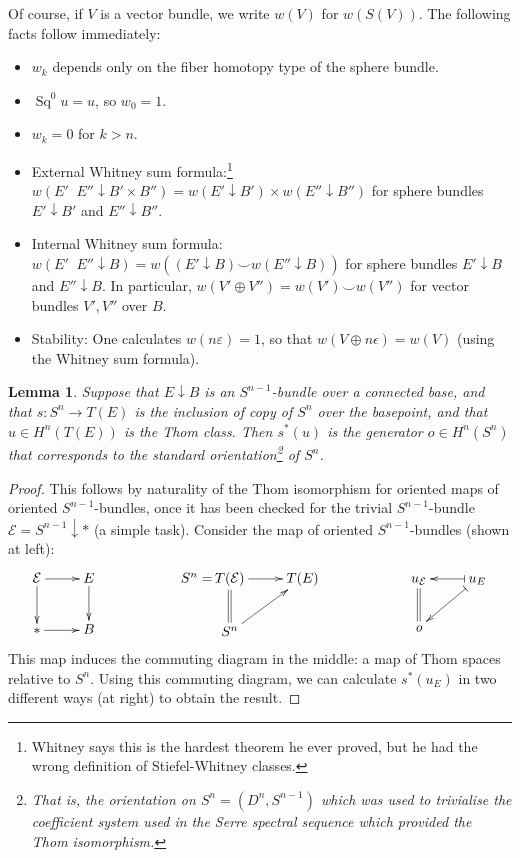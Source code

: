 \documentclass{article}
\DeclareMathOperator{\Sq}{Sq}
\newtheorem{lem}[thm]{Lemma}
\begin{document}
Of course, if $V$ is a vector bundle, we write $w(V)$ for $w(S(V))$. The following facts follow immediately:
\begin{itemize}
\item $w_k$ depends only on the fiber homotopy type of the sphere bundle.
\item $\Sq^0 u = u$, so $w_0 = 1$.
\item $w_k = 0$ for $k > n$.
\item External Whitney sum formula:\footnote{Whitney says this is the hardest theorem he ever proved, but he had the wrong definition of Stiefel-Whitney classes.} $w(E'\mathop{\widehat\ast}E''\downarrow B'\times B'')=w(E'\downarrow B')\times w(E''\downarrow B'')$ for sphere bundles $E'\downarrow B'$ and $E''\downarrow B''$.
\item Internal Whitney sum formula: $w(E'\mathop{\ast_B} E''\downarrow B)=w((E'\downarrow B)\smile w(E''\downarrow B))$ for sphere bundles $E'\downarrow B$ and $E''\downarrow B$.
In particular, $w(V'\oplus V'')=w(V')\smile w(V'')$ for vector bundles $V',V''$ over $B$.
\item Stability: One calculates $w(n\varepsilon) = 1$, so that $w(V \oplus n\epsilon) = w(V)$  (using the Whitney sum formula).
\end{itemize}
\begin{lem}\label{ThomClassLem}
Suppose that $E\downarrow B$ is an $S^{n-1}$-bundle over a connected base, and that $s:S^n\to T(E)$ is the inclusion of copy of $S^n$ over the basepoint, and that $u\in H^n(T(E))$ is the Thom class. Then $s^*(u)$ is the generator $\mathit{o}\in H^n(S^n)$ that corresponds to the standard orientation\footnote{That is, the orientation on $S^n=(D^n,S^{n-1})$ which was used to trivialise the coefficient system used in the Serre spectral sequence which provided the Thom isomorphism.} of $S^n$.
\end{lem}
\begin{proof}
This follows by naturality of the Thom isomorphism for oriented maps of oriented $S^{n-1}$-bundles, once it has been checked for the trivial $S^{n-1}$-bundle $\mathcal{E}=S^{n-1}\downarrow*$ (a simple task). Consider the map of oriented $S^{n-1}$-bundles (shown at left):
\[\xymatrix{
\mathcal{E}\ar[r]\ar[d]&E\ar[d]\\
\ast\ar[r]&B
}\qquad\qquad\qquad\qquad
{
\xymatrix{
\makebox[0mm][r]{$S^n=\,$}T(\mathcal{E})\ar[r]&T(E)\\
S^n\ar@{=}[u]\ar[ur]
}\qquad\qquad\qquad
\xymatrix{
u_\mathcal{E}\ar@{=}[d]&\ar@{|->}[l]u_E\ar@{|->}[dl]\\
\mathit{o}
}}\]
This map induces the commuting diagram in the middle: a map of Thom spaces relative to $S^n$. Using this commuting diagram, we can calculate $s^*(u_E)$ in two different ways (at right) to obtain the result.
\end{proof}
\end{document}
